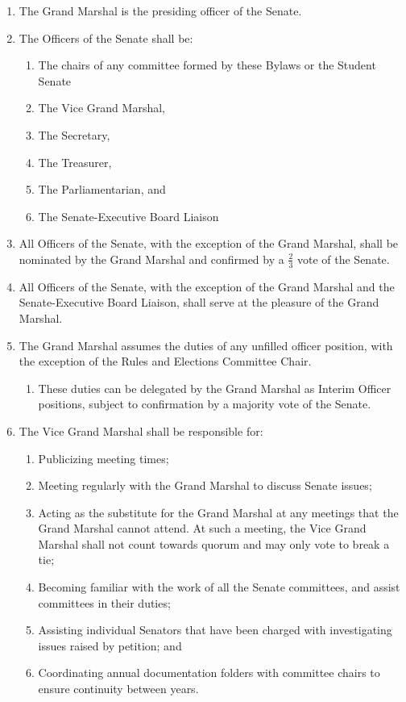 
\begin{enumerate}

\item The Grand Marshal is the presiding officer of the Senate.

\item The Officers of the Senate shall be:
\begin{enumerate}
\item The chairs of any committee formed by these Bylaws or the Student Senate
\item The Vice Grand Marshal,
\item The Secretary,
\item The Treasurer,
\item The Parliamentarian, and
\item The Senate-Executive Board Liaison
\end{enumerate}

\item All Officers of the Senate, with the exception of the Grand Marshal, shall be nominated by the Grand Marshal and confirmed
by a $\frac{2}{3}$ vote of the Senate.

\item All Officers of the Senate, with the exception of the Grand Marshal and the Senate-Executive Board Liaison, shall serve at the pleasure of the Grand Marshal.

\item The Grand Marshal assumes the duties of any unfilled officer position, with the exception of the Rules and Elections
Committee Chair.
\begin{enumerate}
\item These duties can be delegated by the Grand Marshal as Interim Officer positions, subject to confirmation by a majority vote of the Senate.
\end{enumerate}

\item The Vice Grand Marshal shall be responsible for:
\begin{enumerate}
\item Publicizing meeting times;
\item Meeting regularly with the Grand Marshal to discuss Senate issues;
\item Acting as the substitute for the Grand Marshal at any meetings that the Grand Marshal cannot attend. At such a meeting, the Vice Grand Marshal shall not count towards quorum and may only vote to break a tie;
\item Becoming familiar with the work of all the Senate committees, and assist committees in their duties;
\item Assisting individual Senators that have been charged with investigating issues raised by petition; and
\item Coordinating annual documentation folders with committee chairs to ensure continuity between years.
\end{enumerate}


\end{enumerate}
